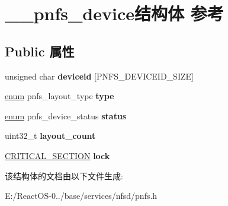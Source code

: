 \hypertarget{struct____pnfs__device}{}\section{\+\_\+\+\_\+pnfs\+\_\+device结构体 参考}
\label{struct____pnfs__device}
\subsection*{Public 属性}
\begin{DoxyCompactItemize}
\item 
\mbox{\label{struct____pnfs__device_ab49500a0aff8e92cfce0ad213b808fec}} 
unsigned char {\bfseries deviceid} \mbox{[}P\+N\+F\+S\+\_\+\+D\+E\+V\+I\+C\+E\+I\+D\+\_\+\+S\+I\+ZE\mbox{]}
\item 
\mbox{\label{struct____pnfs__device_a6b8772ec0e620c540b4593a86efa48fa}} 
\hyperlink{interfaceenum}{enum} pnfs\+\_\+layout\+\_\+type {\bfseries type}
\item 
\mbox{\label{struct____pnfs__device_a7d66519c0507f5a6747175971c8653f5}} 
\hyperlink{interfaceenum}{enum} pnfs\+\_\+device\+\_\+status {\bfseries status}
\item 
\mbox{\label{struct____pnfs__device_a6b6b52a1a0102341a14be89a1a66fd1a}} 
uint32\+\_\+t {\bfseries layout\+\_\+count}
\item 
\mbox{\label{struct____pnfs__device_a695b2e856cc1e069602a6537b18c8166}} 
\hyperlink{struct___c_r_i_t_i_c_a_l___s_e_c_t_i_o_n}{C\+R\+I\+T\+I\+C\+A\+L\+\_\+\+S\+E\+C\+T\+I\+ON} {\bfseries lock}
\end{DoxyCompactItemize}


该结构体的文档由以下文件生成\+:\begin{DoxyCompactItemize}
\item 
E\+:/\+React\+O\+S-\/0../base/services/nfsd/pnfs.\+h\end{DoxyCompactItemize}
